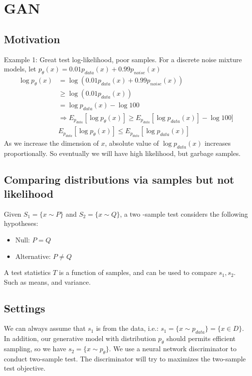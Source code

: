 \chapter{GAN} 
\section{Motivation} 
Example 1: Great test log-likelihood, poor samples. For a discrete noise mixture models, let $p_\theta(x) = 0.01 p_{data}(x) + 0.99 p_{noise}(x)$
    \begin{align*}
        \log p_\theta(x) 
        & = \log(0.01p_{data}(x) + 0.99p_{noise}(x))\\
        & \geq \log(0.01p_{data}(x))\\
        & = \log p_{data}(x) - \log 100\\
        & \Longrightarrow E_{p_{data}}[\log p_\theta(x)] \geq E_{p_{data}}[\log p_{data}(x)] - \log 100]\\
        & E_{p_{data}}[\log p_\theta(x)] \leq  E_{p_{data}}[\log p_{data}(x)] \tag{By non-negative KL divergence} 
    \end{align*}
As we increase the dimension of $x$, absolute value of $\log p_{data} (x)$ increases proportionally. So eventually we will have high likelihood, but garbage samples. 

\section{Comparing distributions via samples but not likelihood} 
Given $S_1 = \{ x \sim P \}$ and $S_2 = \{ x \sim Q \}$, a two -sample test considers the following hypotheses: 
    \begin{itemize}
        \item Null: $P = Q$
        \item Alternative: $P \neq Q$
    \end{itemize}
A test statistics $T$ is a function of samples, and can be used to compare $s_1, s_2$. Such as means, and variance. \\

\section{Settings} 
We can always assume that $s_1$ is from the data, i.e.: $s_1 =  \{ x \sim p_{data} \}  = \{ x \in D \} $. In addition, our generative model with distribution $p_\theta$ should permits efficient sampling, so we have $s_2 = \{x \sim p_\theta \}$. We use a neural network discriminator to conduct two-sample test. The discriminator will try to maximizes the two-sample test objective. 

